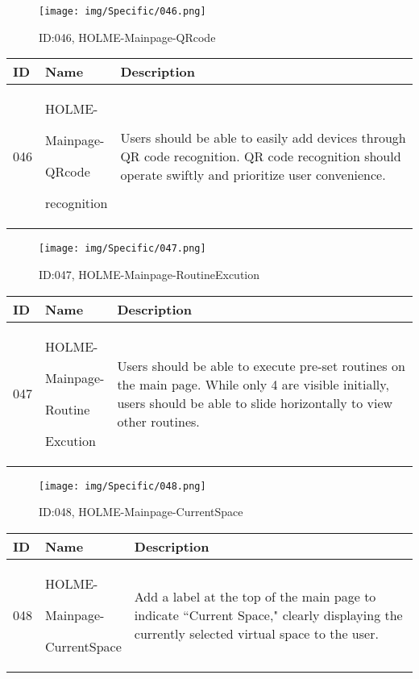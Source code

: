 \documentclass[conference]{IEEEtran}
\begin{document}
\begin{enumerate}
\begin{figure}[h]
\centering
\texttt{[image: img/Specific/046.png]}
\caption{ID:046, HOLME-Mainpage-QRcode}
\end{figure}
\begin{table}[h]
\def\arraystretch{1.2} \small
    \begin{tabular}{|p{1cm}|p{1.8cm}|p{5.0cm}|}
        \hline
        ID & Name & Description\\ \hline
         046 \par  & HOLME-\par Mainpage-\par QRcode \par recognition &Users should be able to easily add devices through QR code recognition. QR code recognition should operate swiftly and prioritize user convenience.\\ \hline
    \end{tabular}
\end{table}

\begin{figure}[h]
\centering
\texttt{[image: img/Specific/047.png]}
\caption{ID:047, HOLME-Mainpage-RoutineExcution}
\end{figure}
\begin{table}[h]
\def\arraystretch{1.2} \small
    \begin{tabular}{|p{1cm}|p{1.8cm}|p{5.0cm}|}
        \hline
        ID & Name & Description\\ \hline
         047 \par  & HOLME-\par Mainpage-\par Routine \par Excution &Users should be able to execute pre-set routines on the main page. While only 4 are visible initially, users should be able to slide horizontally to view other routines.\\ \hline
    \end{tabular}
\end{table}

\begin{figure}[h]
\centering
\texttt{[image: img/Specific/048.png]}
\caption{ID:048, HOLME-Mainpage-CurrentSpace}
\end{figure}
\begin{table}[h]
\def\arraystretch{1.2} \small
    \begin{tabular}{|p{1cm}|p{1.8cm}|p{5.0cm}|}
        \hline
        ID & Name & Description\\ \hline
         048 \par  & HOLME-\par Mainpage-\par CurrentSpace &Add a label at the top of the main page to indicate ``Current Space," clearly displaying the currently selected virtual space to the user.\\ \hline
    \end{tabular}
\end{table}


\end{enumerate}
\end{document}
